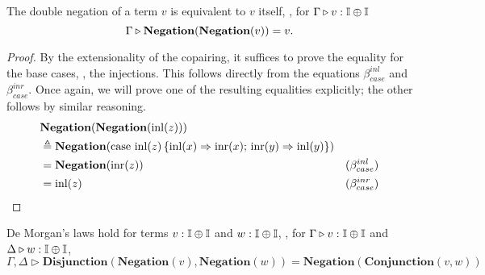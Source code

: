 




\begin{lemma} \label{lem:dneg}
  The double negation of a term $v$ is equivalent to $v$ itself, \ie, for $ \Gamma \triangleright v: \mathbb{I} \oplus \mathbb{I}$
  $$ \Gamma \triangleright \textbf{Negation} (\textbf{Negation} (v) ) = v.$$
\end{lemma}

\begin{proof}
  By the extensionality of the copairing, it suffices to prove the equality for the base cases, \ie, the injections. This follows directly from the equations \(\beta_{case}^{inl}\) and \(\beta_{case}^{inr}\). Once again, we will prove one of the resulting equalities explicitly; the other follows by similar reasoning.
    \begin{equation*}
    \begin{split}
       &\textbf{Negation} (\textbf{Negation} (\mathrm{inl}(z)) )  \\
        & \triangleq   \textbf{Negation} ( \text{case } \mathrm{inl}(z) \,
    \{\mathrm{inl}(x) 
        \Rightarrow \mathrm{inr}(x) ; \,
      \mathrm{inr}(y) \Rightarrow \mathrm{inl}(y)
    \}) \\
    & = \textbf{Negation}(\mathrm{inr}(z)) & (\beta_{case}^{inl}) \\
    & = \mathrm{inl}(z) & (\beta_{case}^{inr})
    \end{split} 
    \end{equation*}
\end{proof}

\begin{lemma} \label{lem:dmorgan} 
  De Morgan's laws hold for terms  $v: \mathbb{I} \oplus \mathbb{I}$ and $w: \mathbb{I} \oplus \mathbb{I}$, \ie, for $ \Gamma \triangleright v: \mathbb{I} \oplus \mathbb{I}$ and $ \Delta \triangleright w: \mathbb{I} \oplus \mathbb{I}$,
  $$  \Gamma, \Delta \triangleright \textbf{Disjunction} (\textbf{Negation} (v) , \textbf{Negation} (w)) =  \textbf{Negation}(\textbf{Conjunction} (v, w)) $$ 
\end{lemma}


